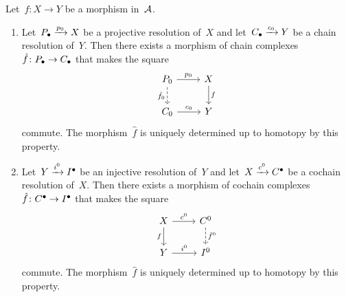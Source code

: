 \begin{theorem}
  Let~$f \colon X \to Y$ be a morphism in~$\mathcal{A}$.
  \begin{enumerate}
    \item
      \label{comparison for projective}
      Let~$P_\bullet \xrightarrow{p_0} X$ be a projective resolution of~$X$ and let~$C_\bullet \xrightarrow{c_0} Y$ be a chain resolution of~$Y$.
      Then there exists a morphism of chain complexes~$\hat{f} \colon P_\bullet \to C_\bullet$ that makes the square
      \begin{equation}
        \label{comparison square for projective}
        \begin{tikzcd}
            P_0
            \arrow{r}[above]{p_0}
            \arrow[dashed]{d}[left]{\hat{f}_0}
          & X
            \arrow{d}[right]{f}
          \\
            C_0
            \arrow{r}[above]{c_0}
          & Y
        \end{tikzcd}
      \end{equation}
      commute.
      The morphism~$\hat{f}$ is uniquely determined up to homotopy by this property.
    \item
      \label{comparison for injective}
      Let~$Y \xrightarrow{i^0} I^\bullet$ be an injective resolution of~$Y$ and let~$X \xrightarrow{c^0} C^\bullet$ be a cochain resolution of~$X$.
      Then there exists a morphism of cochain complexes~$\hat{f} \colon C^\bullet \to I^\bullet$ that makes the square
      \begin{equation}
        \label{comparison square for injective}
        \begin{tikzcd}
            X
            \arrow{r}[above]{c^0}
            \arrow{d}[left]{f}
          & C^0
            \arrow[dashed]{d}[right]{\hat{f}^0}
          \\
            Y
            \arrow{r}[above]{i^0}
          & I^0
        \end{tikzcd}
      \end{equation}
      commute.
      The morphism~$\hat{f}$ is uniquely determined up to homotopy by this property.
  \end{enumerate}
\end{theorem}


